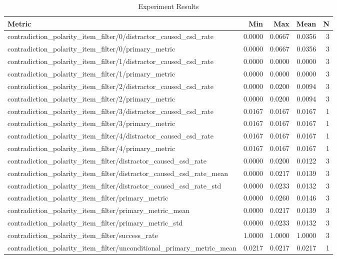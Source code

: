 \begin{table}[h]
\centering
\caption{Experiment Results}
\begin{tabular}{lrrrr}
\hline
Metric & Min & Max & Mean & N \\
\hline
contradiction_polarity_item_filter/0/distractor_caused_csd_rate & 0.0000 & 0.0667 & 0.0356 & 3 \\
contradiction_polarity_item_filter/0/primary_metric & 0.0000 & 0.0667 & 0.0356 & 3 \\
contradiction_polarity_item_filter/1/distractor_caused_csd_rate & 0.0000 & 0.0000 & 0.0000 & 3 \\
contradiction_polarity_item_filter/1/primary_metric & 0.0000 & 0.0000 & 0.0000 & 3 \\
contradiction_polarity_item_filter/2/distractor_caused_csd_rate & 0.0000 & 0.0200 & 0.0094 & 3 \\
contradiction_polarity_item_filter/2/primary_metric & 0.0000 & 0.0200 & 0.0094 & 3 \\
contradiction_polarity_item_filter/3/distractor_caused_csd_rate & 0.0167 & 0.0167 & 0.0167 & 1 \\
contradiction_polarity_item_filter/3/primary_metric & 0.0167 & 0.0167 & 0.0167 & 1 \\
contradiction_polarity_item_filter/4/distractor_caused_csd_rate & 0.0167 & 0.0167 & 0.0167 & 1 \\
contradiction_polarity_item_filter/4/primary_metric & 0.0167 & 0.0167 & 0.0167 & 1 \\
contradiction_polarity_item_filter/distractor_caused_csd_rate & 0.0000 & 0.0200 & 0.0122 & 3 \\
contradiction_polarity_item_filter/distractor_caused_csd_rate_mean & 0.0000 & 0.0217 & 0.0139 & 3 \\
contradiction_polarity_item_filter/distractor_caused_csd_rate_std & 0.0000 & 0.0233 & 0.0132 & 3 \\
contradiction_polarity_item_filter/primary_metric & 0.0000 & 0.0260 & 0.0146 & 3 \\
contradiction_polarity_item_filter/primary_metric_mean & 0.0000 & 0.0217 & 0.0139 & 3 \\
contradiction_polarity_item_filter/primary_metric_std & 0.0000 & 0.0233 & 0.0132 & 3 \\
contradiction_polarity_item_filter/success_rate & 1.0000 & 1.0000 & 1.0000 & 3 \\
contradiction_polarity_item_filter/unconditional_primary_metric_mean & 0.0217 & 0.0217 & 0.0217 & 1 \\

\end{tabular}
\end{table}
